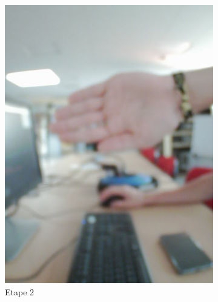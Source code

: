 \documentclass[a4paper,french]{article}
\begin{document}
\begin{figure}[!ht]
\begin{subfigure}{0.25\textwidth}
        \includegraphics[width=\textwidth]{figures/etape2.png}
        \caption{Etape 2}
        \label{subfig:etape2}
    \end{subfigure}
    \begin{subfigure}{0.25\textwidth}

\end{subfigure}
\end{figure}
\end{document}
